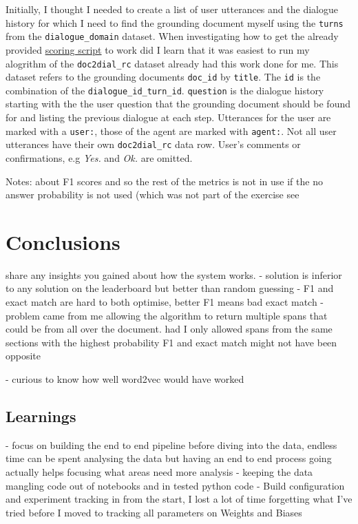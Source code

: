 \documentclass[11pt]{article}
\begin{document}
    Initially, I thought I needed to create a list of user utterances and the dialogue history for which I need to find the
    grounding document myself using the \texttt{turns} from the \texttt{dialogue\_domain} dataset. When investigating how
    to get the already provided \href{https://github.com/doc2dial/sharedtask-dialdoc2021/blob/master/scripts/sharedtask_utils.py}{scoring script}
    to work did I learn that it was easiest to run my alogrithm of the \texttt{doc2dial\_rc} dataset already had this work done for me.
    This dataset refers to the grounding documents \texttt{doc\_id} by \texttt{title}.
    The \texttt{id} is the combination of the \texttt{dialogue\_id\_turn\_id}. \texttt{question} is the dialogue history starting
    with the the user question that the grounding document should be found for and listing the previous dialogue at each step.
    Utterances for the user are marked with a \texttt{user:}, those of the agent are marked with \texttt{agent:}. Not
    all user utterances have their own \texttt{doc2dial\_rc} data row. User's comments or confirmations, e.g \textit{Yes.} and
    \textit{Ok.} are omitted.



    Notes: about F1 scores and so the rest of the metrics is not in use if the no answer probability is not used (which was not part of the exercise
    see \cite{squad2git}


    \section{Conclusions}\label{sec:conclusions}
    share any insights you gained about how the system works.
    - solution is inferior to any solution on the leaderboard but better than random guessing
    - F1 and exact match are hard to both optimise, better F1 means bad exact match
    -   problem came from me allowing the algorithm to return multiple spans that could be from all over the document.
    had I only allowed spans from the same sections with the highest probability F1 and exact match might not have been opposite

    - curious to know how well word2vec would have worked

    \subsection{Learnings}\label{subsec:learnings}
    - focus on building the end to end pipeline before diving into the data, endless time can be spent analysing the data
    but having an end to end process going actually helps focusing what areas need more analysis
    - keeping the data mangling code out of notebooks and in tested python code
    - Build configuration and experiment tracking in from the start, I lost a lot of time forgetting what I've tried before I
    moved to tracking all parameters on Weights and Biases


    
    
\end{document}
